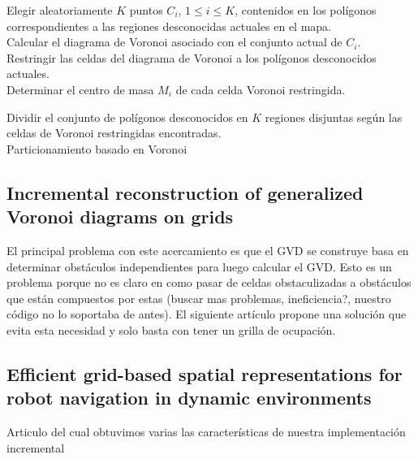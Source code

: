 \begin{algorithm}
\SetAlgoLined
    Elegir aleatoriamente $K$ puntos $C_i$, $1 \leq i \leq K$, contenidos en los polígonos correspondientes a las regiones desconocidas actuales en el mapa.\\
    Calcular el diagrama de Voronoi asociado con el conjunto actual de $C_i$.\\
    Restringir las celdas del diagrama de Voronoi a los polígonos desconocidos actuales.\\
    Determinar el centro de masa $M_i$ de cada celda Voronoi restringida.\\
    
    Dividir el conjunto de polígonos desconocidos en $K$ regiones disjuntas según las celdas de Voronoi restringidas encontradas.\\
    \caption{Particionamiento basado en Voronoi}
    \label{alg:particionamientovoronoi}
    
\end{algorithm}


\subsection{Incremental reconstruction of generalized Voronoi diagrams on grids}

El principal problema con este acercamiento es que el GVD se construye basa en determinar obstáculos independientes para luego calcular el GVD. Esto es un problema porque no es claro en como pasar de celdas obstaculizadas a obstáculos que están compuestos por estas (buscar mas problemas, ineficiencia?, nuestro código no lo soportaba de antes).  El siguiente artículo propone una solución que evita esta necesidad y solo basta con tener un grilla de ocupación.

\subsection{Efficient grid-based spatial representations for robot navigation in dynamic environments}
Articulo del cual obtuvimos varias las características de nuestra implementación incremental


